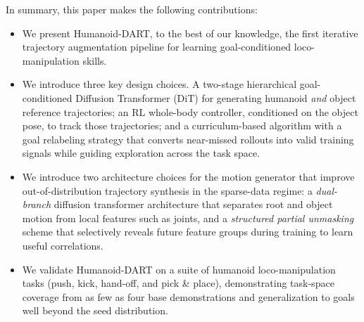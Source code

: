 \documentclass{article}
\newcommand{\papertitle}{Humanoid-DART}
\begin{document}


In summary, this paper makes the following contributions:
\begin{itemize}
    \item We present {\papertitle}, to the best of our knowledge, the first iterative trajectory augmentation pipeline for learning   
    goal-conditioned loco-manipulation skills.%
    \item We introduce three key design choices. A two-stage hierarchical goal-conditioned Diffusion Transformer (DiT) for generating humanoid \textit{and} object reference trajectories; an RL whole-body controller, conditioned on the object pose, to track those trajectories; and a curriculum-based algorithm with a goal relabeling strategy that converts near-missed rollouts into valid training signals while guiding exploration across the task space.
    \item We introduce two architecture choices for the motion generator that improve out-of-distribution trajectory synthesis in the sparse-data regime: a \textit{dual-branch} diffusion transformer architecture that separates root and object motion from local features such as joints, and a \textit{structured partial unmasking} scheme that selectively reveals future feature groups during training to learn useful correlations. 
    \item We validate {\papertitle} on a suite of humanoid loco-manipulation tasks (push, kick, hand-off, and pick \& place), demonstrating task-space coverage from as few as four base demonstrations and generalization to goals well 
    beyond the seed distribution.
\end{itemize}
\end{document}
